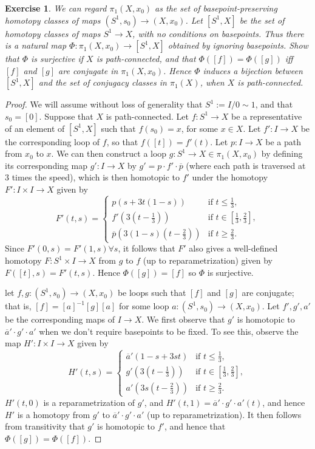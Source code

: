 \documentclass{article}
\newtheorem{exercise}{Exercise}[subsection]
\begin{document}
\begin{exercise}
We can regard $\pi_1(X,x_0)$ as the set of basepoint-preserving homotopy classes of maps $(S^1,s_0)\to(X,x_0)$. Let $[S^1,X]$ be the set of homotopy classes of maps $S^1\to X$, with no conditions on basepoints. Thus there is a natural map $\Phi:\pi_1(X,x_0)\to [S^1,X]$ obtained by ignoring basepoints. Show that $\Phi$ is surjective if $X$ is path-connected, and that $\Phi([f])=\Phi([g])$ iff $[f]$ and $[g]$ are conjugate in $\pi_1(X,x_0)$. Hence $\Phi$ induces a bijection between $[S^1,X]$ and the set of conjugacy classes in $\pi_1(X)$, when $X$ is path-connected.
\end{exercise}
\begin{proof}
We will assume without loss of generality that $S^1:=I/0\sim 1$, and that $s_0=[0]$. Suppose that $X$ is path-connected. Let $f:S^1\to X$ be a representative of an element of $[S^1,X]$ such that $f(s_0)=x$, for some $x\in X$. Let $f':I\to X$ be the corresponding loop of $f$, so that $f([t])=f'(t)$. Let $p:I\to X$ be a path from $x_0$ to $x$. We can then construct a loop $g:S^1\to X\in\pi_1(X,x_0)$ by defining its corresponding map $g':I\to X$ by $g'=p\cdot f'\cdot\overline{p}$ (where each path is traversed at $3$ times the speed), which is then homotopic to $f'$ under the homotopy $F':I\times I\to X$ given by\[F'(t,s)=\begin{cases}
    p(s+3t(1-s))&\text{if }t\leq\frac{1}{3},\\
    f'(3(t-\frac{1}{3}))&\text{if }t\in[\frac{1}{3},\frac{2}{3}],\\
    \overline{p}(3(1-s)(t-\frac{2}{3}))&\text{if }t\geq\frac{2}{3}.
\end{cases}\]Since $F'(0,s)=F'(1,s)\forall s$, it follows that $F'$ also gives a well-defined homotopy $F:S^1\times I\to X$ from $g$ to $f$ (up to reparametrization) given by $F([t],s)=F'(t,s)$. Hence $\Phi([g])=[f]$ so $\Phi$ is surjective.

let $f,g:(S^1,s_0)\to (X,x_0)$ be loops such that $[f]$ and $[g]$ are conjugate; that is, $[f]=[a]^{-1}[g][a]$ for some loop $a:(S^1,s_0)\to (X,x_0)$. Let $f',g',a'$ be the corresponding maps of $I\to X$. We first observe that $g'$ is homotopic to $\overline{a}'\cdot g'\cdot a'$ when we don't require basepoints to be fixed. To see this, observe the map $H':I\times I\to X$ given by \[H'(t,s)=\begin{cases}
    \overline{a}'(1-s+3st)&\text{if }t\leq \frac{1}{3},\\
    g'(3(t-\frac{1}{3}))&\text{if }t\in[\frac{1}{3},\frac{2}{3}],\\
    a'(3s(t-\frac{2}{3}))&\text{if }t\geq\frac{2}{3}.
\end{cases}\] $H'(t,0)$ is a reparametrization of $g'$, and $H'(t,1)=\overline{a}'\cdot g'\cdot a'(t)$, and hence $H'$ is a homotopy from $g'$ to $\overline{a}'\cdot g'\cdot a'$ (up to reparametrization). It then follows from transitivity that $g'$ is homotopic to $f'$, and hence that $\Phi([g])=\Phi([f])$.


\end{proof}
\end{document}
